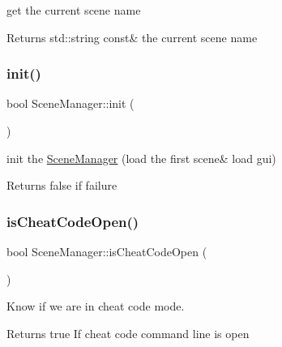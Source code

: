 get the current scene name 

\begin{DoxyReturn}{Returns}
std\+::string const\& the current scene name 
\end{DoxyReturn}
\mbox{\label{class_scene_manager_afdfd47d1316c64d753bf192d513cbb6e}} 
\subsubsection{\texorpdfstring{init()}{init()}}
{\footnotesize\ttfamily bool Scene\+Manager\+::init (\begin{DoxyParamCaption}{ }\end{DoxyParamCaption})\hspace{0.3cm}{\ttfamily [static]}}



init the \hyperlink{class_scene_manager}{Scene\+Manager} (load the first scene\& load gui) 

\begin{DoxyReturn}{Returns}
false if failure 
\end{DoxyReturn}
\mbox{\label{class_scene_manager_adf58aea97d9dc2a8a21b15012e40076b}} 
\subsubsection{\texorpdfstring{is\+Cheat\+Code\+Open()}{isCheatCodeOpen()}}
{\footnotesize\ttfamily bool Scene\+Manager\+::is\+Cheat\+Code\+Open (\begin{DoxyParamCaption}{ }\end{DoxyParamCaption})\hspace{0.3cm}{\ttfamily [static]}}



Know if we are in cheat code mode. 

\begin{DoxyReturn}{Returns}
true If cheat code command line is open 
\end{DoxyReturn}
\mbox{\label{class_scene_manager_a7163901c7efca6117be5a8911eb6adce}} 
